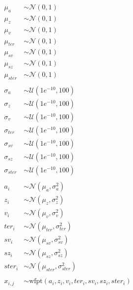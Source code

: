 \documentclass{article}
\begin{document}
\begin{align*}
\mu_{a} &\sim \mathcal{N}(0, 1) \\
\mu_{z} &\sim \mathcal{N}(0, 1) \\
\mu_{v} &\sim \mathcal{N}(0, 1) \\
\mu_{ter} &\sim \mathcal{N}(0, 1) \\
\mu_{sv} &\sim \mathcal{N}(0, 1) \\
\mu_{sz} &\sim \mathcal{N}(0, 1) \\
\mu_{ster} &\sim \mathcal{N}(0, 1) \\
\\
\sigma_{a} &\sim \mathcal{U}(1e^{-10}, 100) \\
\sigma_{z} &\sim \mathcal{U}(1e^{-10}, 100) \\
\sigma_{v} &\sim \mathcal{U}(1e^{-10}, 100) \\
\sigma_{ter} &\sim \mathcal{U}(1e^{-10}, 100) \\
\sigma_{sv} &\sim \mathcal{U}(1e^{-10}, 100) \\
\sigma_{sz} &\sim \mathcal{U}(1e^{-10}, 100) \\
\sigma_{ster} &\sim \mathcal{U}(1e^{-10}, 100) \\
\\
a_{i} &\sim \mathcal{N}(\mu_{a}, \sigma_{a}^2) \\
z_{i} &\sim \mathcal{N}(\mu_{z}, \sigma_{z}^2) \\
v_{i} &\sim \mathcal{N}(\mu_{v}, \sigma_{v}^2) \\
ter_{i} &\sim \mathcal{N}(\mu_{ter}, \sigma_{ter}^2) \\
sv_{i} &\sim \mathcal{N}(\mu_{sv}, \sigma_{sv}^2) \\
sz_{i} &\sim \mathcal{N}(\mu_{sz}, \sigma_{sz}^2) \\
ster_{i} &\sim \mathcal{N}(\mu_{ster}, \sigma_{ster}^2) \\
 \\
x_{i, j} &\sim \text{wfpt}(a_{i}, z_{i}, v_{i}, ter_{i}, sv_{i}, sz_{i}, ster_{i})\\
\end{align*}
\end{document}
